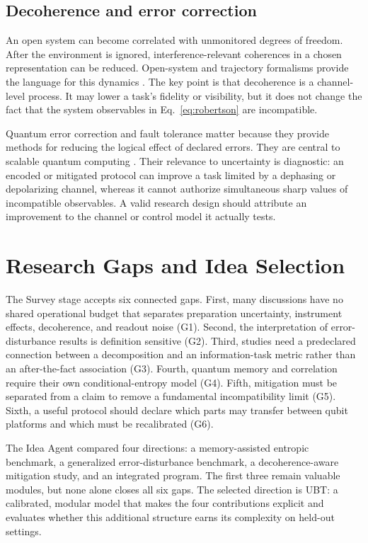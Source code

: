 \documentclass[conference]{../../../../Conference-LaTeX-template_10-17-19/IEEEtran}
\begin{document}
\subsection{Decoherence and error correction}

An open system can become correlated with unmonitored degrees of freedom. After the environment is ignored, interference-relevant coherences in a chosen representation can be reduced. Open-system and trajectory formalisms provide the language for this dynamics \cite{daley2014}. The key point is that decoherence is a channel-level process. It may lower a task's fidelity or visibility, but it does not change the fact that the system observables in Eq.~\eqref{eq:robertson} are incompatible.

Quantum error correction and fault tolerance matter because they provide methods for reducing the logical effect of declared errors. They are central to scalable quantum computing \cite{steane1998,devitt2013}. Their relevance to uncertainty is diagnostic: an encoded or mitigated protocol can improve a task limited by a dephasing or depolarizing channel, whereas it cannot authorize simultaneous sharp values of incompatible observables. A valid research design should attribute an improvement to the channel or control model it actually tests.

\section{Research Gaps and Idea Selection}

The Survey stage accepts six connected gaps. First, many discussions have no shared operational budget that separates preparation uncertainty, instrument effects, decoherence, and readout noise (G1). Second, the interpretation of error-disturbance results is definition sensitive (G2). Third, studies need a predeclared connection between a decomposition and an information-task metric rather than an after-the-fact association (G3). Fourth, quantum memory and correlation require their own conditional-entropy model (G4). Fifth, mitigation must be separated from a claim to remove a fundamental incompatibility limit (G5). Sixth, a useful protocol should declare which parts may transfer between qubit platforms and which must be recalibrated (G6).

The Idea Agent compared four directions: a memory-assisted entropic benchmark, a generalized error-disturbance benchmark, a decoherence-aware mitigation study, and an integrated program. The first three remain valuable modules, but none alone closes all six gaps. The selected direction is UBT: a calibrated, modular model that makes the four contributions explicit and evaluates whether this additional structure earns its complexity on held-out settings.
\end{document}
